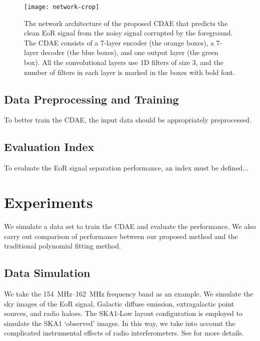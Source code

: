 \documentclass[letters,a4paper,fleqn,usenatbib]{mnras}
\begin{document}
\begin{figure}
  \centering
  \texttt{[image: network-crop]}
  \caption{\label{fig:network}%
    The network architecture of the proposed CDAE that
    predicts the clean EoR signal from the noisy signal corrupted by
    the foreground.
    The CDAE consists of a 7-layer encoder (the orange boxes),
    a 7-layer decoder (the blue boxes), and one output layer
    (the green box).
    All the convolutional layers use 1D filters of size 3, and
    the number of filters in each layer is marked in the boxes
    with bold font.}
\end{figure}


\subsection{Data Preprocessing and Training}
\label{sec:data}

To better train the CDAE, the input data should be appropriately
preprocessed.


\subsection{Evaluation Index}
\label{sec:index}

To evaluate the EoR signal separation performance, an index must be defined...


\section{Experiments}
\label{sec:expriments}

We simulate a data set to train the CDAE and evaluate the performance.
We also carry out comparison of performance between our proposed method
and the traditional polynomial fitting method.


\subsection{Data Simulation}
\label{sec:simulation}

We take the \SIrange{154}{162}{\MHz} frequency band as an example.
We simulate the sky images of the EoR signal, Galactic diffuse emission,
extragalactic point sources, and radio haloes.
The SKA1-Low layout configuration is employed to simulate the SKA1
`observed' images.
In this way, we take into account the complicated instrumental effects
of radio interferometers.
See \citealt{li2018} for more details.
\end{document}

